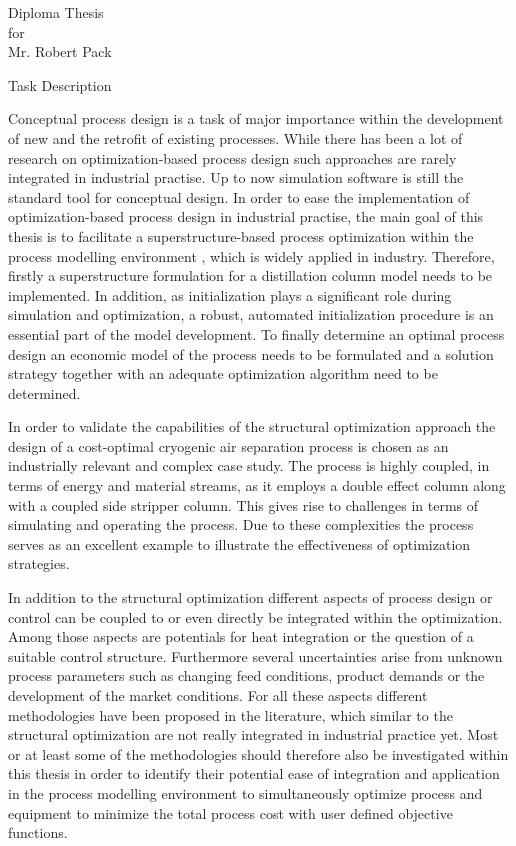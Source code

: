 \thispagestyle{plain}

\begin{center}
	\LARGE
	Diploma Thesis\\
	for\\
	Mr. Robert Pack\\
	\vspace{4ex}

	\vspace{3ex} Task Description
\end{center}

\normalsize

Conceptual process design is a task of major importance within the development of new and the retrofit 
of existing processes. While there has been a lot of research on optimization-based process design such 
approaches are rarely integrated in industrial practise. Up to now simulation software is still the standard 
tool for conceptual design. In order to ease the implementation of optimization-based process design in 
industrial practise, the main goal of this thesis is to facilitate a superstructure-based process optimization 
within the process modelling environment \gproms, which is widely applied in industry. Therefore, firstly a 
superstructure formulation for a distillation column model needs to be implemented. In addition, as initialization 
plays a significant role during simulation and optimization, a robust, automated initialization procedure is an 
essential part of the model development. To finally determine an optimal process design an economic model 
of the process needs to be formulated and a solution strategy together with an adequate optimization 
algorithm need to be determined.

In order to validate the capabilities of the structural optimization approach the design of a cost-optimal cryogenic 
air separation process is chosen as an industrially relevant and complex case study. The process is highly coupled, 
in terms of energy and material streams, as it employs a double effect column along with a coupled side stripper column. 
This gives rise to challenges in terms of simulating and operating the process. Due to these complexities the process 
serves as an excellent example to illustrate the effectiveness of optimization strategies.

In addition to the structural optimization different aspects of process design or control can be coupled to or even 
directly be integrated within the optimization. Among those aspects are potentials for heat integration or the question 
of a suitable control structure. Furthermore several uncertainties arise from unknown process parameters such as changing 
feed conditions, product demands or the development of the market conditions. For all these aspects different methodologies 
have been proposed in the literature, which similar to the structural optimization are not really integrated in industrial 
practice yet.  Most or at least some of the methodologies should therefore also be investigated within this thesis in order 
to identify their potential ease of integration and application in the process modelling environment \gproms to 
simultaneously optimize process and equipment to minimize the total process cost with user defined objective functions.


